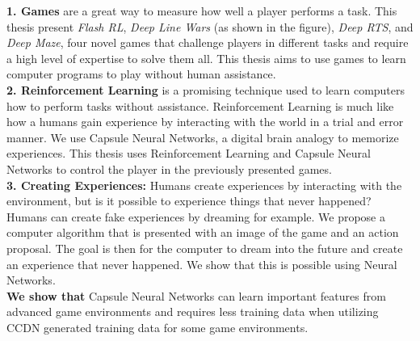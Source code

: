 \documentclass[11pt]{article} %
\begin{document}
\noindent
\textbf{1. Games} are a great way to measure how well a player performs a task. This thesis present \textit{Flash RL}, \textit{Deep Line Wars} (as shown in the figure), \textit{Deep RTS}, and \textit{Deep Maze}, four novel games that challenge players in different tasks and require a high level of expertise to solve them all. This thesis aims to use games to learn computer programs to play without human assistance.
\\

\noindent
\textbf{2. Reinforcement Learning} is a promising technique used to learn computers how to perform tasks without assistance. Reinforcement Learning is much like how a humans gain experience by interacting with the world in a trial and error manner. We use Capsule Neural Networks, a digital brain analogy to memorize experiences. This thesis uses Reinforcement Learning and Capsule Neural Networks to control the player in the previously presented games. 
\\

\noindent
\textbf{3. Creating Experiences:} Humans create experiences by interacting with the environment, but is it possible to experience things that never happened? Humans can create fake experiences by dreaming for example. We propose a computer algorithm that is presented with an image of the game and an action proposal. The goal is then for the computer to dream into the future and create an experience that never happened. We show that this is possible using Neural Networks.
\\

\noindent
\textbf{We show that} Capsule Neural Networks can learn important features from advanced game environments and requires less training data when utilizing CCDN generated training data for some game environments.




\end{document}
